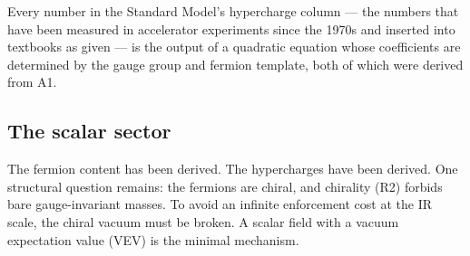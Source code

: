 \documentclass[11pt]{article}
\begin{document}
Every number in the Standard Model's hypercharge column --- the numbers that have been measured in accelerator experiments since the 1970s and inserted into textbooks as given --- is the output of a quadratic equation whose coefficients are determined by the gauge group and fermion template, both of which were derived from A1.

\subsection{The scalar sector}
\label{sec:higgs}

The fermion content has been derived.  The hypercharges have been derived.  One structural question remains: the fermions are chiral, and chirality (R2) forbids bare gauge-invariant masses.  To avoid an infinite enforcement cost at the IR scale, the chiral vacuum must be broken.  A scalar field with a vacuum expectation value (VEV) is the minimal mechanism.
\end{document}
